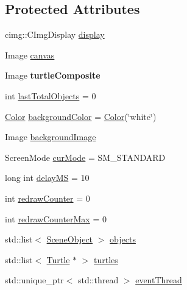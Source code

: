 \subsection*{Protected Attributes}
\begin{DoxyCompactItemize}
\item 
cimg\+::\+C\+Img\+Display \hyperlink{classcturtle_1_1InteractiveTurtleScreen_a5ab4e006c97cfd1610dc565188e9c9b0}{display}
\item 
Image \hyperlink{classcturtle_1_1InteractiveTurtleScreen_a5231bfae24c5e5387059fccffa9a7170}{canvas}
\item 
\mbox{\label{classcturtle_1_1InteractiveTurtleScreen_a3a6e3d9249b40dccc5a4e4f0f1dd4075}} 
Image {\bfseries turtle\+Composite}
\item 
int \hyperlink{classcturtle_1_1InteractiveTurtleScreen_afd74d43945f4eb82bb71e0d2b4a72a50}{last\+Total\+Objects} = 0
\item 
\hyperlink{classcturtle_1_1Color}{Color} \hyperlink{classcturtle_1_1InteractiveTurtleScreen_a3cc73fa2f1e0f2579a5bc1917396e023}{background\+Color} = \hyperlink{classcturtle_1_1Color}{Color}(\char`\"{}white\char`\"{})
\item 
Image \hyperlink{classcturtle_1_1InteractiveTurtleScreen_a139236df336d32f5cb44ab8ccfb16475}{background\+Image}
\item 
Screen\+Mode \hyperlink{classcturtle_1_1InteractiveTurtleScreen_a6fd7fc060f0e4adcc08ab1e43e758c49}{cur\+Mode} = S\+M\+\_\+\+S\+T\+A\+N\+D\+A\+RD
\item 
long int \hyperlink{classcturtle_1_1InteractiveTurtleScreen_a26338beec078bb1c29792cd658c1be71}{delay\+MS} = 10
\item 
int \hyperlink{classcturtle_1_1InteractiveTurtleScreen_a39c21ce1ed1de241676ae329ecd962b8}{redraw\+Counter} = 0
\item 
int \hyperlink{classcturtle_1_1InteractiveTurtleScreen_a7cf0a4e382da4be238be3f9d3510b4e7}{redraw\+Counter\+Max} = 0
\item 
std\+::list$<$ \hyperlink{structcturtle_1_1SceneObject}{Scene\+Object} $>$ \hyperlink{classcturtle_1_1InteractiveTurtleScreen_abaea1170c38b5e79865841834c50718d}{objects}
\item 
std\+::list$<$ \hyperlink{classcturtle_1_1Turtle}{Turtle} $\ast$ $>$ \hyperlink{classcturtle_1_1InteractiveTurtleScreen_ae227fdb4ee9017964e314d6e0c76cee4}{turtles}
\item 
std\+::unique\+\_\+ptr$<$ std\+::thread $>$ \hyperlink{classcturtle_1_1InteractiveTurtleScreen_ace652d27f7e65ee15cd4dab7074874d2}{event\+Thread}

\end{DoxyCompactItemize}

